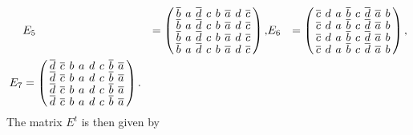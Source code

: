 \documentclass[../../main]{subfiles}
\begin{document}
\begin{align*}
      &
        E_5 &= \left(
              \arraycolsep=2.0pt\def\arraystretch{0.5}
              \begin{array}{cccccccc}
                \bar{b}&a&\bar{d}&c&b&\bar{a}&d&\bar{c}\\
                \bar{b}&a&\bar{d}&c&b&\bar{a}&d&\bar{c}\\
                \bar{b}&a&\bar{d}&c&b&\bar{a}&d&\bar{c}\\
                \bar{b}&a&\bar{d}&c&b&\bar{a}&d&\bar{c}\\
              \end{array}
  \right),
      &
        E_6 &= \left(
              \arraycolsep=2.0pt\def\arraystretch{0.5}
              \begin{array}{cccccccc}
                \bar{c}&d&a&\bar{b}&c&\bar{d}&\bar{a}&b\\
                \bar{c}&d&a&\bar{b}&c&\bar{d}&\bar{a}&b\\
                \bar{c}&d&a&\bar{b}&c&\bar{d}&\bar{a}&b\\
                \bar{c}&d&a&\bar{b}&c&\bar{d}&\bar{a}&b\\
              \end{array}
  \right),
  \\
  E_7 &= \left(
        \arraycolsep=2.0pt\def\arraystretch{0.5}
        \begin{array}{cccccccc}
          \bar{d}&\bar{c}&b&a&d&c&\bar{b}&\bar{a}\\
          \bar{d}&\bar{c}&b&a&d&c&\bar{b}&\bar{a}\\
          \bar{d}&\bar{c}&b&a&d&c&\bar{b}&\bar{a}\\
          \bar{d}&\bar{c}&b&a&d&c&\bar{b}&\bar{a}\\         
        \end{array}
        \right).
\end{align*}
The matrix $E^t$ is then given by
\end{document}
